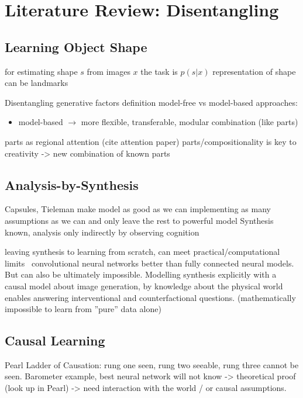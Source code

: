 \chapter{Literature Review: Disentangling}


\section{Learning Object Shape}
for estimating shape $s$ from images $x$ the task is
$p(s|x)$
representation of shape can be landmarks


Disentangling generative factors definition
model-free vs model-based approaches:
\begin{itemize}
	\item model-based $\rightarrow$ more flexible, transferable, modular combination (like parts)
\end{itemize}
parts as regional attention (cite attention paper)
parts/compositionality is key to creativity -> new combination of known parts


\section{Analysis-by-Synthesis}
	Capsules, Tieleman
	make model as good as we can implementing as many assumptions as we can and only leave the rest to powerful model
	Synthesis known, analysis only indirectly by observing cognition

	leaving synthesis to learning from scratch, can meet practical/computational limits \eg\ convolutional neural networks better than fully connected neural models.
	But can also be ultimately impossible. Modelling synthesis explicitly with a causal model about image generation, by knowledge about the physical world enables answering interventional and counterfactional questions. (mathematically impossible to learn from ''pure'' data alone)

\section{Causal Learning}
	Pearl
	Ladder of Causation: rung one seen, rung two seeable, rung three cannot be seen.
	Barometer example, best neural network will not know -> theoretical proof (look up in Pearl) -> need interaction with the world / or causal assumptions.

